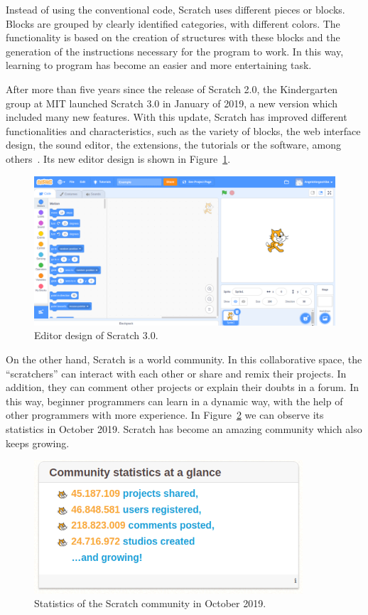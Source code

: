 Instead of using the conventional code, Scratch uses different pieces or blocks. Blocks are grouped by clearly identified categories, with different colors. The functionality is based on the creation of structures with these blocks and the generation of the instructions necessary for the program to work. In this way, learning to program has become an easier and more entertaining task.

After more than five years since the release of Scratch 2.0, the Kindergarten group at MIT launched Scratch 3.0 in January of 2019, a new version which included many new features. With this update, Scratch has improved different functionalities and characteristics, such as the variety of blocks, the web interface design, the sound editor, the extensions, the tutorials or the software, among others~\cite{nin:_scratch3.0}. Its new editor design is shown in Figure~\ref{fig:scratch}.


\begin{figure}
  \centering
  \includegraphics[width=12cm, keepaspectratio]{img/scratch.png}
  \caption{Editor design of Scratch 3.0.}
  \label{fig:scratch}
\end{figure}

On the other hand, Scratch is a world community. In this collaborative space, the ``scratchers'' can interact with each other or share and remix their projects. In addition, they can comment other projects or explain their doubts in a forum. In this way, beginner programmers can learn in a dynamic way, with the help of other programmers with more experience. In Figure~\ref{fig:statistics_scratch} we can observe its statistics in October 2019. Scratch has become an amazing community which also keeps growing. 

\begin{figure}
  \centering
  \includegraphics[width=10cm, keepaspectratio]{img/statistics_scratch.png}
  \caption{Statistics of the Scratch community in October 2019.}
  \label{fig:statistics_scratch}
\end{figure}



